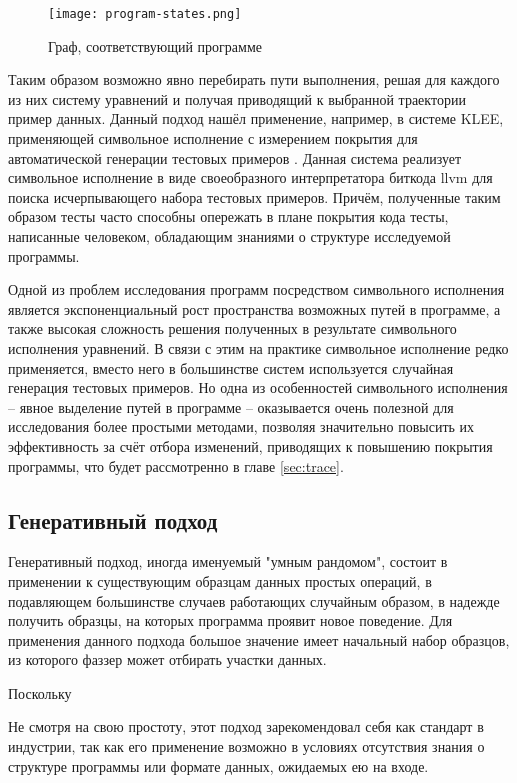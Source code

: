 \begin{figure}[h]
	\centering
	\texttt{[image: program-states.png]}
	\caption{Граф, соответствующий программе}
	\label{fig:py-control-flow-graph}
\end{figure}%

Таким образом возможно явно перебирать пути выполнения, решая для каждого из них систему уравнений и получая приводящий к выбранной траектории пример данных. Данный подход нашёл применение, например, в системе KLEE, применяющей символьное исполнение с измерением покрытия для автоматической генерации тестовых примеров \cite{klee}. Данная система реализует символьное исполнение в виде своеобразного интерпретатора биткода llvm для поиска исчерпывающего набора тестовых примеров. Причём, полученные таким образом тесты часто способны опережать в плане покрытия кода тесты, написанные человеком, обладающим знаниями о структуре исследуемой программы.

Одной из проблем исследования программ посредством символьного исполнения является экспоненциальный рост пространства возможных путей в программе, а также высокая сложность решения полученных в результате символьного исполнения уравнений. В связи с этим на практике символьное исполнение редко применяется, вместо него в большинстве систем используется случайная генерация тестовых примеров. Но одна из особенностей символьного исполнения -- явное выделение путей в программе -- оказывается очень полезной для исследования более простыми методами, позволяя значительно повысить их эффективность за счёт отбора изменений, приводящих к повышению покрытия программы, что будет рассмотренно в главе \ref{sec:trace}.

\subsection{Генеративный подход}

Генеративный подход, иногда именуемый "умным рандомом", состоит в применении к существующим образцам данных простых операций, в подавляющем большинстве случаев работающих случайным образом, в надежде получить образцы, на которых программа проявит новое поведение. Для применения данного подхода большое значение имеет начальный набор образцов, из которого фаззер может отбирать участки данных.

Поскольку %

Не смотря на свою простоту, этот подход зарекомендовал себя как стандарт в индустрии, так как его применение возможно в условиях отсутствия знания о структуре программы или формате данных, ожидаемых ею на входе.

